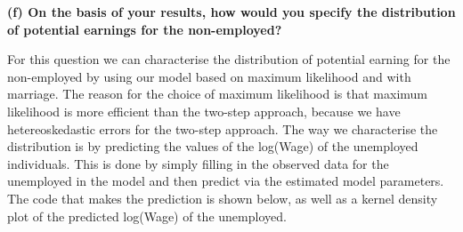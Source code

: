 \documentclass[
]{article}
\newenvironment{Shaded}{\begin{snugshade}}{\end{snugshade}}
\newcommand{\CommentTok}[1]{\textcolor[rgb]{0.56,0.35,0.01}{\textit{#1}}}
\newcommand{\ControlFlowTok}[1]{\textcolor[rgb]{0.13,0.29,0.53}{\textbf{#1}}}
\newcommand{\DataTypeTok}[1]{\textcolor[rgb]{0.13,0.29,0.53}{#1}}
\newcommand{\DecValTok}[1]{\textcolor[rgb]{0.00,0.00,0.81}{#1}}
\newcommand{\KeywordTok}[1]{\textcolor[rgb]{0.13,0.29,0.53}{\textbf{#1}}}
\newcommand{\NormalTok}[1]{#1}
\newcommand{\OperatorTok}[1]{\textcolor[rgb]{0.81,0.36,0.00}{\textbf{#1}}}
\newcommand{\OtherTok}[1]{\textcolor[rgb]{0.56,0.35,0.01}{#1}}
\newcommand{\StringTok}[1]{\textcolor[rgb]{0.31,0.60,0.02}{#1}}
\begin{document}
\textbf{(f) On the basis of your results, how would you specify the
distribution of potential earnings for the non-employed?}

For this question we can characterise the distribution of potential
earning for the non-employed by using our model based on maximum
likelihood and with marriage. The reason for the choice of maximum
likelihood is that maximum likelihood is more efficient than the
two-step approach, because we have hetereoskedastic errors for the
two-step approach. The way we characterise the distribution is by
predicting the values of the log(Wage) of the unemployed individuals.
This is done by simply filling in the observed data for the unemployed
in the model and then predict via the estimated model parameters. The
code that makes the prediction is shown below, as well as a kernel
density plot of the predicted log(Wage) of the unemployed.

\begin{Shaded}
\end{Shaded}
\end{document}
